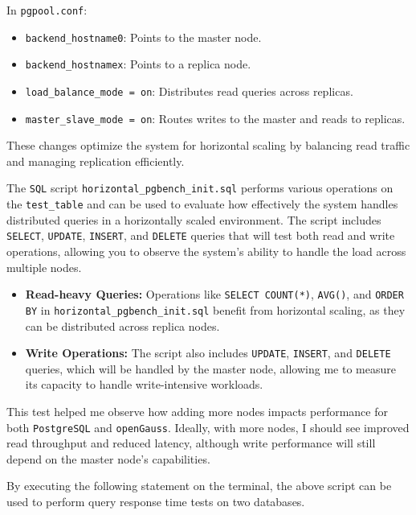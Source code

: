 \documentclass[12pt,a4paper,cs4size]{ctexart}
\begin{document}
In \texttt{pgpool.conf}:

\begin{itemize}
    \item \texttt{backend\_hostname0}: Points to the master node.
    \item \texttt{backend\_hostnamex}: Points to a replica node.
    \item \texttt{load\_balance\_mode = on}: Distributes read queries across replicas.
    \item \texttt{master\_slave\_mode = on}: Routes writes to the master and reads to replicas.
\end{itemize}

These changes optimize the system for horizontal scaling by balancing read traffic and managing replication efficiently.

The \texttt{SQL} script \texttt{horizontal\_pgbench\_init.sql}\cite{github2024} performs various operations on the \texttt{test\_table} and can be used to evaluate how effectively the system handles distributed queries in a horizontally scaled environment. The script includes \texttt{SELECT}, \texttt{UPDATE}, \texttt{INSERT}, and \texttt{DELETE} queries that will test both read and write operations, allowing you to observe the system's ability to handle the load across multiple nodes.

\begin{itemize}
    \item \textbf{Read-heavy Queries:} Operations like \texttt{SELECT COUNT(*)}, \texttt{AVG()}, and \texttt{ORDER BY} in \texttt{horizontal\_pgbench\_init.sql}\cite{github2024} benefit from horizontal scaling, as they can be distributed across replica nodes.
    \item \textbf{Write Operations:} The script also includes \texttt{UPDATE}, \texttt{INSERT}, and \texttt{DELETE} queries, which will be handled by the master node, allowing me to measure its capacity to handle write-intensive workloads.
\end{itemize}

This test helped me observe how adding more nodes impacts performance for both \texttt{PostgreSQL} and \texttt{openGauss}. Ideally, with more nodes, I should see improved read throughput and reduced latency, although write performance will still depend on the master node's capabilities.

By executing the following statement on the terminal, the above script can be used to perform query response time tests on two databases.
\end{document}
